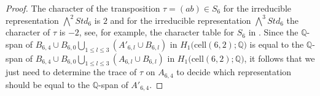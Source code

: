 \documentclass[12py]{amsart}%
\theoremstyle{definition}\newtheorem{definition}[thm]{Definition}
\theoremstyle{definition}
\newcommand{\Q}{\ensuremath{\mathbb{Q}}}
\begin{document}
\begin{proof}

The character of the transposition $\tau=(a b)\in S_{6}$ for the irreducible representation $\bigwedge^{2}Std_{6}$ is $2$ and for the irreducible representation $\bigwedge^{3}Std_{6}$ the character of $\tau$ is $-2$, see, for example, the character table for $S_{6}$ in \cite{james2001representations}. Since the $\Q$-span of $B_{6,4}\cup B_{6,0}\bigcup_{1\le l\le 3}(A'_{6,l}\cup B_{6,l})$ in $H_{1}\big(\text{cell}(6, 2);\Q\big)$ is equal to the $\Q$-span of $B_{6,4}\cup B_{6,0}\bigcup_{1\le l\le 3}(A_{6,l}\cup B_{6,l})$ in $H_{1}\big(\text{cell}(6, 2);\Q\big)$, it follows that we just need to determine the trace of $\tau$ on $A_{6,4}$ to decide which representation should be equal to the $\Q$-span of $A'_{6,4}$.


\end{proof}
\end{document}
